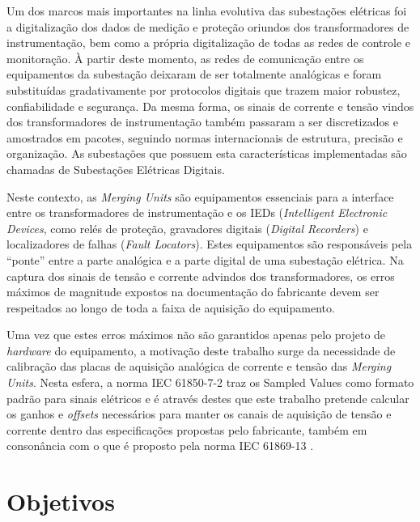 Um dos marcos mais importantes na linha evolutiva das subestações elétricas foi a digitalização dos dados de medição e proteção oriundos dos transformadores de instrumentação, bem como a própria digitalização de todas as redes de controle e monitoração. À partir deste momento, as redes de comunicação entre os equipamentos da subestação deixaram de ser totalmente analógicas e foram substituídas gradativamente por protocolos digitais que trazem maior robustez, confiabilidade e segurança. Da mesma forma, os sinais de corrente e tensão vindos dos transformadores de instrumentação também passaram a ser discretizados e amostrados em pacotes, seguindo normas internacionais de estrutura, precisão e organização. As subestações que possuem esta características implementadas são chamadas de Subestações Elétricas Digitais.

Neste contexto, as \textit{Merging Units} são equipamentos essenciais para a interface entre os transformadores de instrumentação e os IEDs (\textit{Intelligent Electronic Devices}, como relés de proteção, gravadores digitais (\textit{Digital Recorders}) e localizadores de falhas (\textit{Fault Locators}). Estes equipamentos são responsáveis pela ``ponte'' entre a parte analógica e a parte digital de uma subestação elétrica. Na captura dos sinais de tensão e corrente advindos dos transformadores, os erros máximos de magnitude expostos na documentação do fabricante devem ser respeitados ao longo de toda a faixa de aquisição do equipamento.


Uma vez que estes erros máximos não são garantidos apenas pelo projeto de \textit{hardware} do equipamento, a motivação deste trabalho surge da necessidade de calibração das placas de aquisição analógica de corrente e tensão das \textit{Merging Units}. Nesta esfera, a norma IEC 61850-7-2 \cite{IEC61850_7-2} traz os Sampled Values como formato padrão para sinais elétricos e é através destes que este trabalho pretende calcular os ganhos e \textit{offsets} necessários para manter os canais de aquisição de tensão e corrente dentro das especificações propostas pelo fabricante, também em consonância com o que é proposto pela norma IEC 61869-13 \cite{IEC61869-13}. 

\section{Objetivos}

